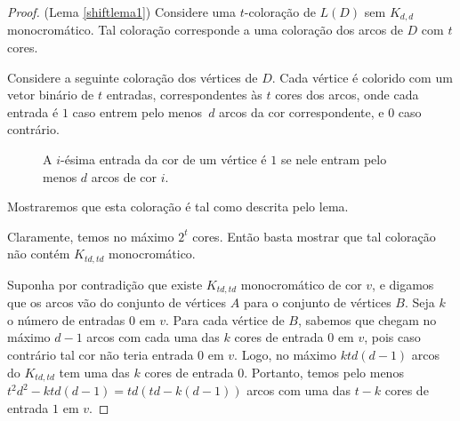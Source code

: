 \begin{proof}{(Lema \ref{shiftlema1})}
Considere uma $t$-coloração de $L(D)$ sem $K_{d,d}$ monocromático. Tal coloração corresponde a uma coloração dos arcos de $D$ com $t$ cores.

Considere a seguinte coloração dos vértices de $D$. Cada vértice é colorido com um vetor binário de $t$ entradas, correspondentes às $t$ cores dos arcos, onde cada entrada é $1$ caso entrem pelo menos~$d$ arcos da cor correspondente, e $0$ caso contrário.

\begin{figure}[H]
\centering
{}
\caption{A $i$-ésima entrada da cor de um vértice é $1$ se nele entram pelo menos $d$ arcos de cor $i$.}
\label{fig:shiftarccoloringtovertex}
\end{figure}

Mostraremos que esta coloração é tal como descrita pelo lema. 

Claramente, temos no máximo $2^t$ cores. Então basta mostrar que tal coloração não contém $K_{td,td}$ monocromático.

Suponha por contradição que existe $K_{td,td}$ monocromático de cor $v$, e digamos que os arcos vão do conjunto de vértices $A$ para o conjunto de vértices $B$. Seja $k$ o número de entradas $0$ em $v$. Para cada vértice de $B$, sabemos que chegam no máximo $d-1$ arcos com cada uma das $k$ cores de entrada $0$ em $v$, pois caso contrário tal cor não teria entrada $0$ em $v$. Logo, no máximo $ktd(d-1)$ arcos do $K_{td,td}$ tem uma das $k$ cores de entrada $0$. Portanto, temos pelo menos $t^2d^2 - ktd(d-1) = td(td - k(d-1))$ arcos com uma das $t-k$ cores de entrada $1$ em $v$.


\end{proof}
